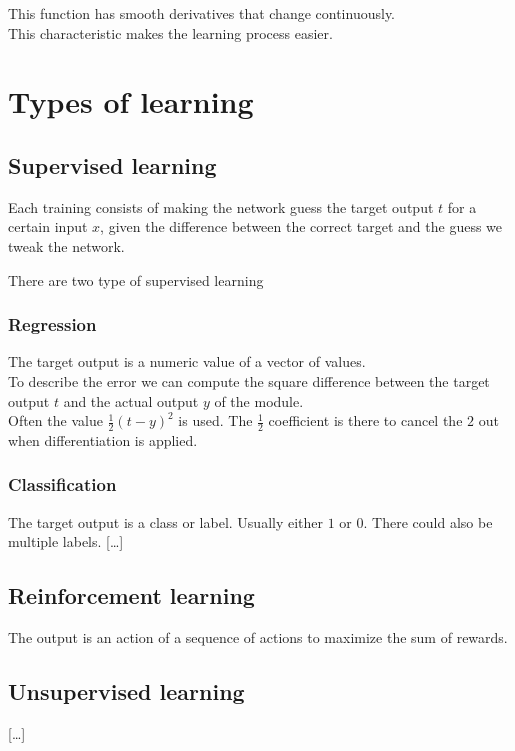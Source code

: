 \documentclass[a4paper]{article}
\begin{document}
This function has smooth derivatives that change continuously. \\
This characteristic makes the learning process easier.

\pagebreak


\section{Types of learning}

\subsection{Supervised learning}
Each training consists of making the network guess the target output \(t\) for a certain input \(x\), given the difference between the correct target and the guess we tweak the network.

There are two type of supervised learning

\subsubsection{Regression}
The target output is a numeric value of a vector of values. \\
To describe the error we can compute the square difference between the target output \(t\) and the actual output \(y\) of the module. \\
Often the value \(\frac{1}{2}{(t-y)}^2\) is used. The \(\frac{1}{2}\) coefficient is there to cancel the \(2\) out when differentiation is applied.

\subsubsection{Classification}
The target output is a class or label. Usually either \(1\) or \(0\).
There could also be multiple labels.
[\ldots]

\subsection{Reinforcement learning}
The output is an action of a sequence of actions to maximize the sum of rewards.

\subsection{Unsupervised learning}
[\ldots]
\end{document}
